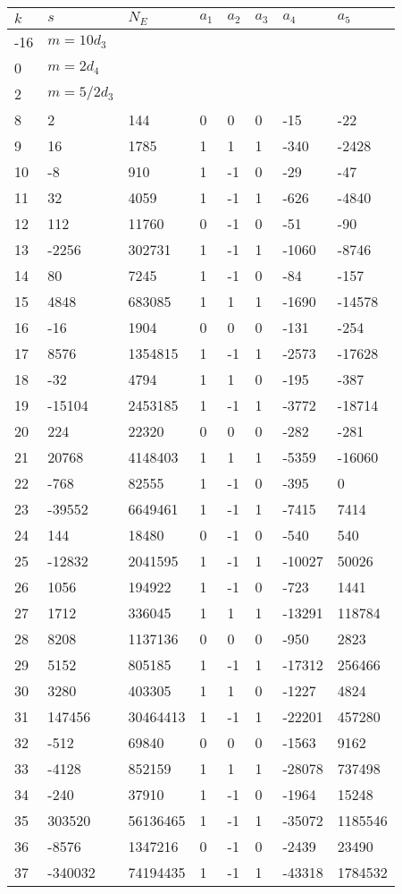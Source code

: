 \documentclass{amsart}
\begin{document}
\begin{longtable}{|l|l|l|lllll|}
\hline
$k$ & $s$ & $N_E$ & $a_1$ & $a_2$ & $a_3$ & $a_4$ & $a_5$\\
\hline
-16&$m=10d_{3}$&&\multicolumn{5}{c|}{}\\
0&$m=2d_{4}$&&\multicolumn{5}{c|}{}\\
2&$m=5/2d_{3}$&&\multicolumn{5}{c|}{}\\
8&2&144&0&0&0&-15&-22\\
9&16&1785&1&1&1&-340&-2428\\
10&-8&910&1&-1&0&-29&-47\\
11&32&4059&1&-1&1&-626&-4840\\
12&112&11760&0&-1&0&-51&-90\\
13&-2256&302731&1&-1&1&-1060&-8746\\
14&80&7245&1&-1&0&-84&-157\\
15&4848&683085&1&1&1&-1690&-14578\\
16&-16&1904&0&0&0&-131&-254\\
17&8576&1354815&1&-1&1&-2573&-17628\\
18&-32&4794&1&1&0&-195&-387\\
19&-15104&2453185&1&-1&1&-3772&-18714\\
20&224&22320&0&0&0&-282&-281\\
21&20768&4148403&1&1&1&-5359&-16060\\
22&-768&82555&1&-1&0&-395&0\\
23&-39552&6649461&1&-1&1&-7415&7414\\
24&144&18480&0&-1&0&-540&540\\
25&-12832&2041595&1&-1&1&-10027&50026\\
26&1056&194922&1&-1&0&-723&1441\\
27&1712&336045&1&1&1&-13291&118784\\
28&8208&1137136&0&0&0&-950&2823\\
29&5152&805185&1&-1&1&-17312&256466\\
30&3280&403305&1&1&0&-1227&4824\\
31&147456&30464413&1&-1&1&-22201&457280\\
32&-512&69840&0&0&0&-1563&9162\\
33&-4128&852159&1&1&1&-28078&737498\\
34&-240&37910&1&-1&0&-1964&15248\\
35&303520&56136465&1&-1&1&-35072&1185546\\
36&-8576&1347216&0&-1&0&-2439&23490\\
37&-340032&74194435&1&-1&1&-43318&1784532\\

\end{longtable}
\end{document}
